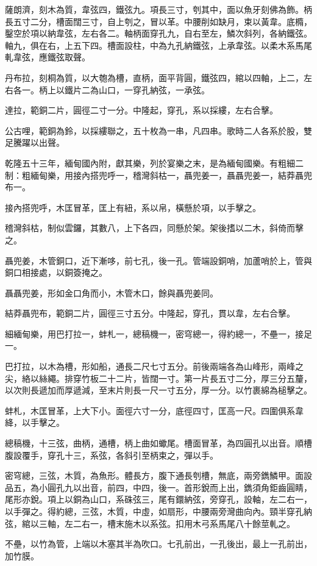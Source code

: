 \begin{pinyinscope}
薩朗濟，刻木為質，韋弦四，鐵弦九。項長三寸，刳其中，面以魚牙刻佛為飾。柄長五寸二分，槽面闊三寸，自上刳之，冒以革。中腰削如缺月，束以黃韋。底橢，鑿空於項以納韋弦，左右各二。軸柄面穿孔九，自右至左，鱗次斜列，各納鐵弦。軸九，俱在右，上五下四。槽面設柱，中為九孔納鐵弦，上承韋弦。以柔木系馬尾軋韋弦，應鐵弦取聲。

丹布拉，刻桐為質，以大匏為槽，直柄，面平背圓，鐵弦四，綰以四軸，上二，左右各一。柄上以鐵片二為山口，一穿孔納弦，一承弦。

達拉，範銅二片，圓徑二寸一分。中隆起，穿孔，系以採縷，左右合擊。

公古哩，範銅為鈴，以採縷聯之，五十枚為一串，凡四串。歌時二人各系於股，雙足騰躍以出聲。

乾隆五十三年，緬甸國內附，獻其樂，列於宴樂之末，是為緬甸國樂。有粗細二制：粗緬甸樂，用接內搭兜呼一，稽灣斜枯一，聶兜姜一，聶聶兜姜一，結莽聶兜布一。

接內搭兜呼，木匡冒革，匡上有紐，系以帛，橫懸於項，以手擊之。

稽灣斜枯，制似雲鑼，其數八，上下各四，同懸於架。架後搘以二木，斜倚而擊之。

聶兜姜，木管銅口，近下漸哆，前七孔，後一孔。管端設銅哨，加蘆哨於上，管與銅口相接處，以銅簽掩之。

聶聶兜姜，形如金口角而小，木管木口，餘與聶兜姜同。

結莽聶兜布，範銅二片，圓徑三寸五分。中隆起，穿孔，貫以韋，左右合擊。

細緬甸樂，用巴打拉一，蚌札一，總稿機一，密穹總一，得約總一，不壘一，接足一。

巴打拉，以木為槽，形如船，通長二尺七寸五分。前後兩端各為山峰形，兩峰之尖，絡以絲繩。排穿竹板二十二片，皆闊一寸。第一片長五寸二分，厚三分五釐，以次則長遞加而厚遞減，至末片則長一尺一寸五分，厚一分。以竹裹綿為槌擊之。

蚌札，木匡冒革，上大下小。面徑六寸一分，底徑四寸，匡高一尺。四圍俱系韋絳，以手擊之。

總稿機，十三弦，曲柄，通槽，柄上曲如蠍尾。槽面冒革，為四圓孔以出音。順槽腹設覆手，穿孔十三，系弦，各斜引至柄束之，彈以手。

密穹總，三弦，木質，為魚形。體長方，腹下通長刳槽，無底，兩旁鐫鱗甲。面設品五，為小圓孔九以出音，前四，中四，後一。首形銳而上出，鐫須角鉅齒圓睛，尾形亦銳。項上以銅為山口，系硃弦三，尾有鐶納弦，旁穿孔，設軸，左二右一，以手彈之。得約總，三弦，木質，中虛，如扇形，中腰兩旁灣曲向內。頸半穿孔納弦，綰以三軸，左二右一，槽末施木以系弦。扣用木弓系馬尾八十餘莖軋之。

不壘，以竹為管，上端以木塞其半為吹口。七孔前出，一孔後出，最上一孔前出，加竹膜。


\end{pinyinscope}

